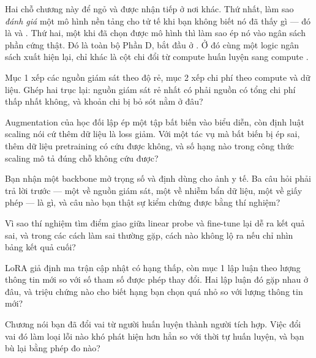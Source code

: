 \documentclass[../../deep_learning.tex]{subfiles}
\begin{document}
Hai chỗ chương này để ngỏ và được nhận tiếp ở nơi khác. Thứ nhất, làm sao \emph{đánh giá} một mô hình nền tảng cho tử tế khi bạn không biết nó đã thấy gì --- đó là  và . Thứ hai, một khi đã chọn được mô hình thì làm sao ép nó vào ngân sách phần cứng thật. Đó là toàn bộ Phần D, bắt đầu ở . Ở đó cùng một logic ngân sách xuất hiện lại, chỉ khác là cột chi đổi từ compute huấn luyện sang compute .
\begin{tukiem}
\item Mục 1 xếp các nguồn giám sát theo độ rẻ, mục 2 xếp chi phí theo compute và dữ liệu. Ghép hai trục lại: nguồn giám sát rẻ nhất có phải nguồn có tổng chi phí thấp nhất không, và khoản chi bị bỏ sót nằm ở đâu?
\item Augmentation của học đối lập ép một tập bất biến vào biểu diễn, còn định luật scaling nói cứ thêm dữ liệu là loss giảm. Với một tác vụ mà bất biến bị ép sai, thêm dữ liệu pretraining có cứu được không, và số hạng nào trong công thức scaling mô tả đúng chỗ không cứu được?
\item Bạn nhận một backbone mở trọng số và định dùng cho ảnh y tế. Ba câu hỏi phải trả lời trước --- một về nguồn giám sát, một về nhiễm bẩn dữ liệu, một về giấy phép --- là gì, và câu nào bạn thật sự kiểm chứng được bằng thí nghiệm?
\item Vì sao thí nghiệm tìm điểm giao giữa linear probe và fine-tune lại dễ ra kết quả sai, và trong các cách làm sai thường gặp, cách nào không lộ ra nếu chỉ nhìn bảng kết quả cuối?
\item LoRA giả định ma trận cập nhật có hạng thấp, còn mục 1 lập luận theo lượng thông tin mới so với số tham số được phép thay đổi. Hai lập luận đó gặp nhau ở đâu, và triệu chứng nào cho biết hạng bạn chọn quá nhỏ so với lượng thông tin mới?
\item Chương nói bạn đã đổi vai từ người huấn luyện thành người tích hợp. Việc đổi vai đó làm loại lỗi nào khó phát hiện hơn hẳn so với thời tự huấn luyện, và bạn bù lại bằng phép đo nào?
\end{tukiem}
\ifSubfilesClassLoaded{\printbibliography[title={Nguồn}]}{}
\end{document}
